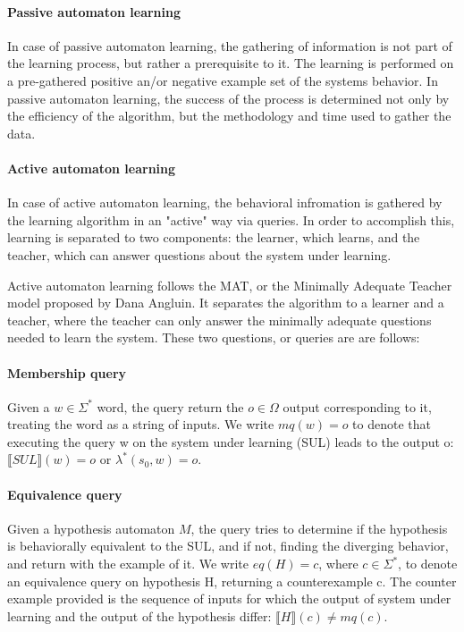 \paragraph{Passive automaton learning} In case of passive automaton learning, the gathering of information is not part of the learning process, but rather a prerequisite to it. The learning is performed on a pre-gathered positive an/or negative example set of the systems behavior. In passive automaton learning, the success of the process is determined not only by the efficiency of the algorithm, but the methodology and time used to gather the data.

\paragraph{Active automaton learning} In case of active automaton learning, the behavioral infromation is gathered by the learning algorithm in an "active" way via queries. In order to accomplish this, learning is separated to two components: the learner, which learns, and the teacher, which can answer questions about the system under learning.


Active automaton learning follows the MAT, or the Minimally Adequate Teacher model proposed by Dana Angluin\cite{ANGLUIN198787}. It separates the algorithm to a learner and a teacher, where the teacher can only answer the minimally adequate questions needed to learn the system. These two questions, or queries are are follows:


\paragraph{Membership query} Given a $w\in\Sigma^{*}$ word, the query return the $o\in \Omega$ output corresponding to it, treating the word as a string of inputs. We write $mq(w) = o$ to denote that executing the query w on the system under learning (SUL) leads to the output o: $\llbracket SUL \rrbracket(w) = o$ or $\lambda^*(s_0, w) = o$.

\paragraph{Equivalence query} Given a hypothesis automaton $M$, the query tries to determine if the hypothesis is behaviorally equivalent to the SUL, and if not, finding the diverging behavior, and return with the example of it. We write $eq(H) = c$, where $c\in\Sigma^*$, to denote an equivalence query on hypothesis H, returning a counterexample c. The counter example provided is the sequence of inputs for which the output of system under learning and the output of the hypothesis differ: $ \llbracket H\rrbracket(c) \neq mq(c)$.

